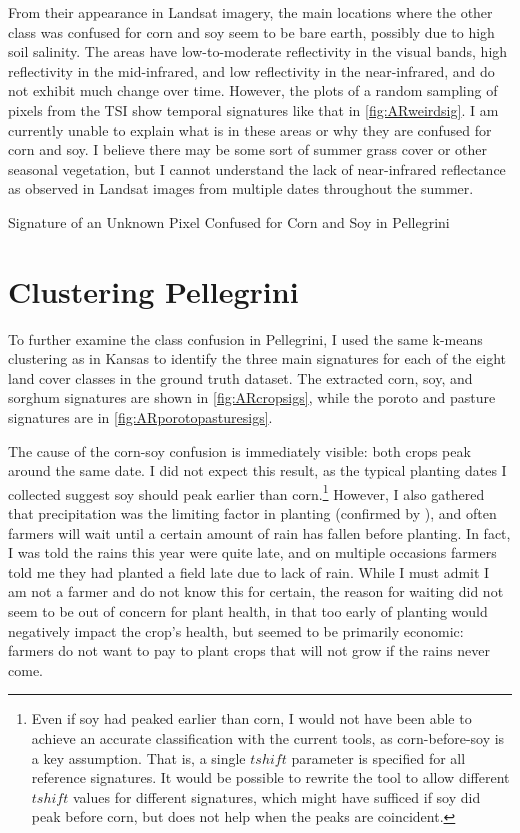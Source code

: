 From their appearance in Landsat imagery, the main locations where the other class was confused for corn and soy seem to be bare earth, possibly due to high soil salinity. The areas have low-to-moderate reflectivity in the visual bands, high reflectivity in the mid-infrared, and low reflectivity in the near-infrared, and do not exhibit much change over time. However, the plots of a random sampling of pixels from the TSI show temporal signatures like that in \autoref{fig:ARweirdsig}.
I am currently unable to explain what is in these areas or why they are confused for corn and soy. I believe there may be some sort of summer grass cover or other seasonal vegetation, but I cannot understand the lack of near-infrared reflectance as observed in Landsat images from multiple dates throughout the summer.

\begin{ssfigure}
  \centering
  
  \caption{Signature of an Unknown Pixel Confused for Corn and Soy in Pellegrini}
  \label{fig:ARweirdsig}
\end{ssfigure}


\section{Clustering Pellegrini}

To further examine the class confusion in Pellegrini, I used the same k-means clustering as in Kansas to identify the three main signatures for each of the eight land cover classes in the ground truth dataset. The extracted corn, soy, and sorghum signatures are shown in \autoref{fig:ARcropsigs}, while the poroto and pasture signatures are in \autoref{fig:ARporotopasturesigs}.

The cause of the corn-soy confusion is immediately visible: both crops peak around the same date. I did not expect this result, as the typical planting dates I collected suggest soy should peak earlier than corn.\footnote{Even if soy had peaked earlier than corn, I would not have been able to achieve an accurate classification with the current tools, as corn-before-soy is a key assumption. That is, a single $tshift$ parameter is specified for all reference signatures. It would be possible to rewrite the tool to allow different $tshift$ values for different signatures, which might have sufficed if soy did peak before corn, but does not help when the peaks are coincident.} However, I also gathered that precipitation was the limiting factor in planting (confirmed by \autocite{sacks2010crop}), and often farmers will wait until a certain amount of rain has fallen before planting. In fact, I was told the rains this year were quite late, and on multiple occasions farmers told me they had planted a field late due to lack of rain. While I must admit I am not a farmer and do not know this for certain, the reason for waiting did not seem to be out of concern for plant health, in that too early of planting would negatively impact the crop's health, but seemed to be primarily economic: farmers do not want to pay to plant crops that will not grow if the rains never come.

